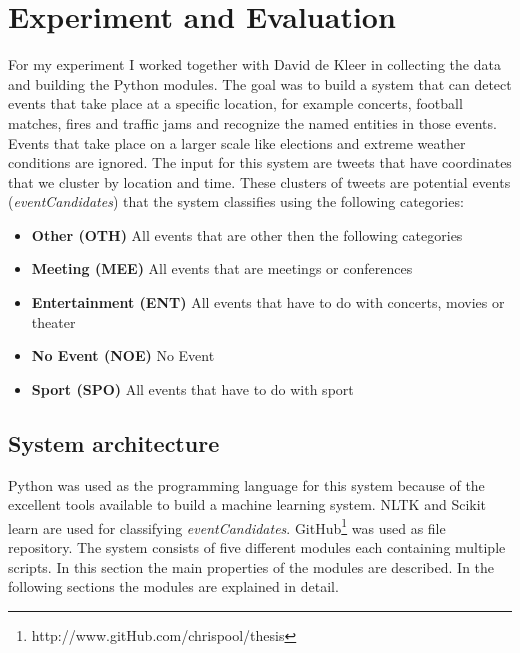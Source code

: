 \documentclass[
10pt, %
a4paper, %
oneside, %
headinclude,footinclude, %
BCOR5mm, %
]{scrartcl}
\begin{document}
\section{Experiment and Evaluation}
For my experiment I worked together with David de Kleer in collecting the data and building the Python modules. The goal was to build a system that can detect events that take place at a specific location, for example concerts, football matches, fires and traffic jams and recognize the named entities in those events.  Events that take place on a larger scale like elections and extreme weather conditions are ignored. The input for this system are tweets that have coordinates that we cluster by location and time. These clusters of tweets are potential events (\textit{eventCandidates}) that the system classifies using the following categories: \newline

\begin{itemize}[noitemsep] %
\item \textbf{Other (OTH)} All events that are other then the following categories 
\item \textbf{Meeting (MEE)} All events that are meetings or conferences 
\item \textbf{Entertainment (ENT)} All events that have to do with concerts, movies or theater
\item \textbf{No Event (NOE)} No Event
\item \textbf{Sport (SPO)} All events that have to do with sport 
\end{itemize}


\subsection{System architecture}
Python was used as the programming language for this system because of the excellent tools available to build a machine learning system. NLTK and Scikit learn are used for classifying \textit{eventCandidates}. GitHub\footnote{http://www.gitHub.com/chrispool/thesis} was used as file repository. The system consists of five different modules each containing multiple scripts. In this section the main properties of the modules are described. In the following sections the modules are explained in detail.
\end{document}
